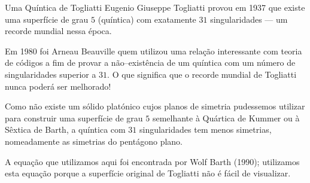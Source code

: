 \begin{surferPage}{Uma Qu\'intica de Togliatti}
    Eugenio Giuseppe Togliatti provou em 1937 que existe uma superf\'icie de grau $5$ (qu\'intica) com exatamente $31$ singularidades  --- um recorde mundial nessa \'epoca.


    Em 1980 foi Arneau Beauville quem utilizou uma rela\c c\~ao  interessante com teoria de c\'odigos a fim de provar a n\~ao--exist\^encia de um qu\'intica com um n\'umero de singularidades  superior a $31$.
   O que significa que o recorde mundial de Togliatti nunca poder\'a ser melhorado!

    Como n\~ao existe um s\'olido plat\'onico cujos planos de simetria pudessemos utilizar para construir uma superf\'icie de grau $5$ semelhante \`a  Qu\'artica de Kummer ou
    \`a S\^extica de Barth, a qu\'intica com $31$ singularidades tem menos simetrias,
    nomeadamente as simetrias do pent\'agono plano.


 A equa\c c\~ao que utilizamos aqui foi encontrada por Wolf Barth (1990);  utilizamos esta equa\c c\~ao porque a superf\'icie original de Togliatti n\~ao \'e f\'acil de visualizar.
 \end{surferPage}
